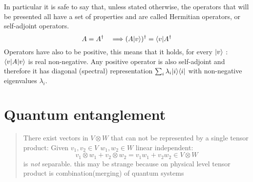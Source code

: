 	In particular it is safe to say that, unless stated otherwise, the operators that will be presented all have a set of properties and are called Hermitian operators, or self-adjoint operators.\\
	$$ A = A^{\dagger} \quad \Longrightarrow (A|v \rangle)^{\dagger} = \langle v|A^{\dagger} $$ 
	Operators have also to be positive, this means that it holds, for every $|v \rangle$ : $\langle v|A|v \rangle$ is real non-negative. Any positive operator is also self-adjoint and therefore it has diagonal (spectral) representation $\sum_i \lambda_i |i\rangle\langle i|$ with non-negative eigenvalues $\lambda_i$.\\    
    
\section{Quantum entanglement}

	\begin{quotation}
		There exist vectors in $V\otimes W$ that can not be represented by a single tensor product:
		Given $v_1,v_2\in V \; w_1,w_2\in W$ linear independent:
    \begin{equation*}
		v_1\otimes w_1 + v_2\otimes w_2 = v_1w_1 + v_2w_2 \in V\otimes W
    \end{equation*}
    is \emph{not} separable.
		this may be strange because on physical level tensor product is combination(merging) of quantum systems
		\end{quotation}
		\cite{Han13}